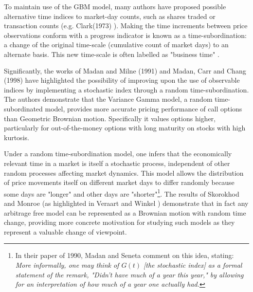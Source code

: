 \documentclass{article}
\begin{document}
To maintain use of the GBM model, many authors have proposed possible alternative time indices to market-day counts, such as shares traded or transaction counts (e.g. Clark(1973) \cite{Clark1973}). Making the time increments between price observations conform with a progress indicator is known as a time-subordination: a change of the original time-scale (cumulative count of market days) to an alternate basis. This new time-scale is often labelled as "business time" \cite{VeraartWinkel}.
 
Significantly,  the works of Madan and Milne (1991) \cite{MadanMilne} and Madan, Carr and Chang (1998) \cite{MadanCarrChang} have highlighted the possibility of improving upon the use of observable  indices by implementing a stochastic index through a random time-subordination. The authors demonstrate that the Variance Gamma model, a random time-subordinated model, provides more accurate pricing performance of call options than Geometric Brownian motion.  Specifically it values options higher, particularly for out-of-the-money options with  long maturity on stocks with high kurtosis.

Under a random time-subordination model, one infers that the economically relevant time in a market is itself a stochastic process, independent of other random processes affecting market dynamics.  This model allows the distribution of price movements itself on different market days to differ randomly because some days are "longer" and other days are "shorter"\footnote{In their paper of 1990, Madan and Seneta comment on this idea, stating: \textit{More informally, one may think of $G(t)$ [the stochastic index] as a formal statement of the remark, "Didn't have much of a year this year," by allowing for an interpretation of how much of a year one actually had.}}. The results of Skorokhod \cite{skororussia} and Monroe \cite{Monroe} (as highlighted in Veraart and Winkel \cite{VeraartWinkel}) demonstrate that in fact any arbitrage free model can be represented as a Brownian motion with random time change, providing more concrete motivation for studying such models as they represent a valuable change of viewpoint.
\end{document}
